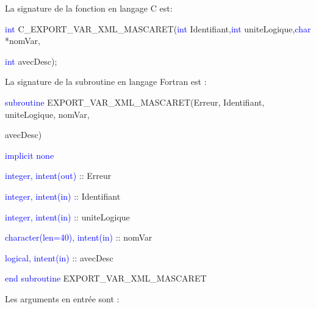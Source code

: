 \documentclass[a4paper,11pt]{article}
\begin{document}
 \vspace{0.5cm}
 
 La signature de la fonction en langage C est:
 
 \vspace{0.5cm}
 
 \textcolor{blue}{int} C\_EXPORT\_VAR\_XML\_MASCARET(\textcolor{blue}{int} Identifiant,\textcolor{blue}{int} uniteLogique,\textcolor{blue}{char} *nomVar,
 
 \textcolor{blue}{int} avecDesc);
 
 \vspace{0.5cm}
 
 La signature de la subroutine en langage Fortran est :
 
 \vspace{0.5cm}
 
    \textcolor{blue}{subroutine} EXPORT\_VAR\_XML\_MASCARET(Erreur, Identifiant, uniteLogique, nomVar,
    
     avecDesc)
    
        \hspace{1cm}\textcolor{blue}{implicit none}                 
        
        \hspace{1cm} \textcolor{blue}{integer, intent(out)} :: Erreur
        
        \hspace{1cm} \textcolor{blue}{integer, intent(in)} :: Identifiant
        
        \hspace{1cm} \textcolor{blue}{integer, intent(in)} :: uniteLogique
        
        \hspace{1cm} \textcolor{blue}{character(len=40), intent(in)} :: nomVar
        
        \hspace{1cm} \textcolor{blue}{logical, intent(in)} :: avecDesc
        
    \textcolor{blue}{end subroutine} EXPORT\_VAR\_XML\_MASCARET
    
 \vspace{0.5cm}
 
 Les arguments en entr\'ee sont :
 
 \vspace{0.5cm}
 
\end{document}
